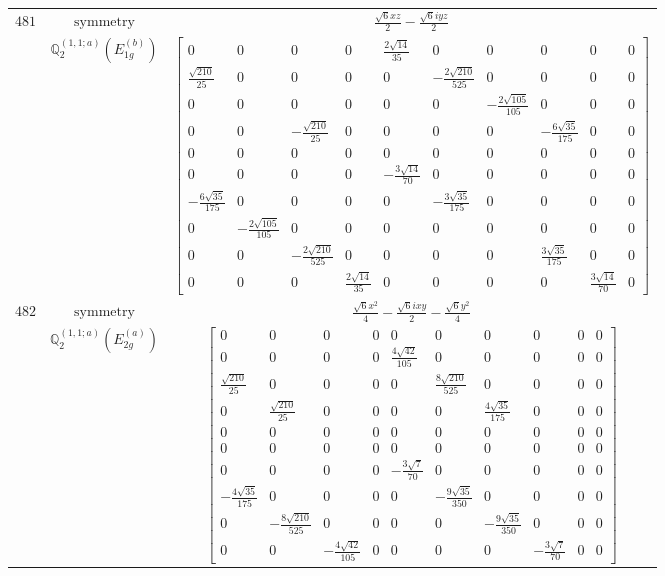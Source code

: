 \documentclass[fleqn,8pt,landscape]{jsarticle}
\begin{document}
\begin{longtable}{ccc}
$ 481 $ & $ \text{symmetry} $ & $ \frac{\sqrt{6} x z}{2} - \frac{\sqrt{6} i y z}{2} $ \\
$  $ & $ \mathbb{Q}_{2}^{(1,1;a)}(E_{1g}^{(b)}) $ & $ \begin{bmatrix} 0 & 0 & 0 & 0 & \frac{2 \sqrt{14}}{35} & 0 & 0 & 0 & 0 & 0 \\ \frac{\sqrt{210}}{25} & 0 & 0 & 0 & 0 & - \frac{2 \sqrt{210}}{525} & 0 & 0 & 0 & 0 \\ 0 & 0 & 0 & 0 & 0 & 0 & - \frac{2 \sqrt{105}}{105} & 0 & 0 & 0 \\ 0 & 0 & - \frac{\sqrt{210}}{25} & 0 & 0 & 0 & 0 & - \frac{6 \sqrt{35}}{175} & 0 & 0 \\ 0 & 0 & 0 & 0 & 0 & 0 & 0 & 0 & 0 & 0 \\ 0 & 0 & 0 & 0 & - \frac{3 \sqrt{14}}{70} & 0 & 0 & 0 & 0 & 0 \\ - \frac{6 \sqrt{35}}{175} & 0 & 0 & 0 & 0 & - \frac{3 \sqrt{35}}{175} & 0 & 0 & 0 & 0 \\ 0 & - \frac{2 \sqrt{105}}{105} & 0 & 0 & 0 & 0 & 0 & 0 & 0 & 0 \\ 0 & 0 & - \frac{2 \sqrt{210}}{525} & 0 & 0 & 0 & 0 & \frac{3 \sqrt{35}}{175} & 0 & 0 \\ 0 & 0 & 0 & \frac{2 \sqrt{14}}{35} & 0 & 0 & 0 & 0 & \frac{3 \sqrt{14}}{70} & 0 \end{bmatrix} $ \\ \hline
$ 482 $ & $ \text{symmetry} $ & $ \frac{\sqrt{6} x^{2}}{4} - \frac{\sqrt{6} i x y}{2} - \frac{\sqrt{6} y^{2}}{4} $ \\
$  $ & $ \mathbb{Q}_{2}^{(1,1;a)}(E_{2g}^{(a)}) $ & $ \begin{bmatrix} 0 & 0 & 0 & 0 & 0 & 0 & 0 & 0 & 0 & 0 \\ 0 & 0 & 0 & 0 & \frac{4 \sqrt{42}}{105} & 0 & 0 & 0 & 0 & 0 \\ \frac{\sqrt{210}}{25} & 0 & 0 & 0 & 0 & \frac{8 \sqrt{210}}{525} & 0 & 0 & 0 & 0 \\ 0 & \frac{\sqrt{210}}{25} & 0 & 0 & 0 & 0 & \frac{4 \sqrt{35}}{175} & 0 & 0 & 0 \\ 0 & 0 & 0 & 0 & 0 & 0 & 0 & 0 & 0 & 0 \\ 0 & 0 & 0 & 0 & 0 & 0 & 0 & 0 & 0 & 0 \\ 0 & 0 & 0 & 0 & - \frac{3 \sqrt{7}}{70} & 0 & 0 & 0 & 0 & 0 \\ - \frac{4 \sqrt{35}}{175} & 0 & 0 & 0 & 0 & - \frac{9 \sqrt{35}}{350} & 0 & 0 & 0 & 0 \\ 0 & - \frac{8 \sqrt{210}}{525} & 0 & 0 & 0 & 0 & - \frac{9 \sqrt{35}}{350} & 0 & 0 & 0 \\ 0 & 0 & - \frac{4 \sqrt{42}}{105} & 0 & 0 & 0 & 0 & - \frac{3 \sqrt{7}}{70} & 0 & 0 \end{bmatrix} $ \\ \hline

\end{longtable}
\end{document}

